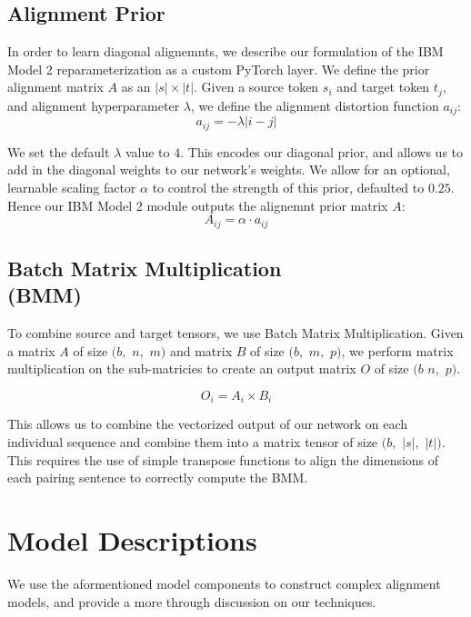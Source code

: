 \documentclass[twoside,twocolumn]{article}
\begin{document}
\subsection{Alignment Prior}
\label{sec:alingment_prior}
In order to learn diagonal alignemnts, we describe our formulation of the
IBM Model 2 reparameterization as a custom PyTorch layer. We define the
prior alignment matrix $A$ as an $|s| \times |t|$. Given a source token
$s_i$ and target token $t_j$, and alignment hyperparameter $\lambda$, we
define the alignment distortion function $a_{ij}$:
\begin{equation}
  a_{ij} = -\lambda | i - j |
\end{equation}

We set the default $\lambda$ value to $4$. This encodes our diagonal prior,
and allows us to add in the diagonal weights to our network's weights. We
allow for an optional, learnable scaling factor $\alpha$ to control the
strength of this prior, defaulted to $0.25$. Hence our IBM Model 2 module
outputs the alignemnt prior matrix $A$:
\begin{equation}
  A_{ij} = \alpha \cdot a_{ij}
\end{equation}

\subsection{Batch Matrix Multiplication\\(BMM)}
\label{sec:bmm}
To combine source and target tensors, we use Batch Matrix Multiplication.
Given a matrix $A$ of size $(b,$ $n,$ $m)$ and matrix $B$ of size
$(b,$ $m,$ $p)$, we perform matrix multiplication on the sub-matricies
to create an output matrix $O$ of size $(b$ $n,$ $p)$.

\begin{equation}
  O_i = A_i \times B_i
\end{equation}

This allows us to combine the vectorized output of our network on each
individual sequence and combine them into a matrix tensor of
size $(b,$ $|s|,$ $|t|)$. This requires the use of simple transpose
functions to align the dimensions of each pairing sentence to correctly
compute the BMM.

\section{Model Descriptions}
We use the aformentioned model components to construct complex alignment
models, and provide a more through discussion on our techniques.
\end{document}
